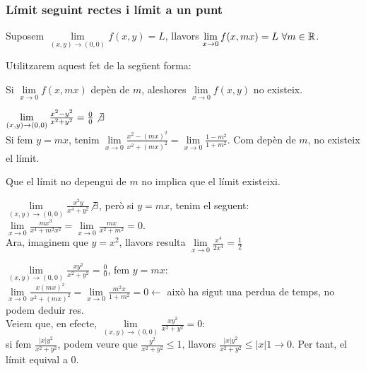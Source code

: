\documentclass[../main.tex]{subfiles}
\begin{document}
    \subsubsection{Límit seguint rectes i límit a un punt}
    \begin{proposicio}
        Suposem $\lim\limits_{(x,y) \rightarrow (0,0)} f(x,y) = L$, llavors $\lim\limits_{x \rightarrow 0} f(x, mx) = L \hbox{ }\forall m \in \mathbb{R}$.
    \end{proposicio}
    Utilitzarem aquest fet de la següent forma:
    \begin{corolari}
        Si $\lim\limits_{x\rightarrow0} f(x, mx)$ depèn de $m$, aleshores $\lim\limits_{x\rightarrow0}f(x,y)$ no existeix.
    \end{corolari}
    \begin{exemple}
        $\lim\limits_{(x,y) \rightarrow(0,0)} \frac{x^2-y^2}{x^2+y^2} = \frac{0}{0} \not\exists$\\
        Si fem $y = mx$, tenim $\lim\limits_{x \rightarrow 0} \frac{x^2-(mx)^2}{x^2+(mx)^2} = \lim\limits_{x \rightarrow 0} \frac{1-m^2}{1+m^2}$.
        Com depèn de $m$, no existeix el límit.
    \end{exemple}
    \begin{obs}
        Que el límit no depengui de $m$ no implica que el límit existeixi.
    \end{obs}
    \begin{exemple}
        $\lim\limits_{(x,y) \rightarrow(0,0)} \frac{x^2y}{x^4+y^2}$$\not\exists$, però si $y = mx$,
        tenim el seguent: $\lim\limits_{x\rightarrow0} \frac{mx^3}{x^4+m^2x^2} = \lim\limits_{x\rightarrow0} \frac{mx}{x^2+m^2} = 0$.\\
        Ara, imaginem que $y = x^2$, llavors resulta $\lim\limits_{x\rightarrow0} \frac{x^4}{2x^4} = \frac{1}{2}$
    \end{exemple}
    \begin{exemple}
        $\lim\limits_{(x,y) \rightarrow(0,0)} \frac{xy^2}{x^2+y^2} = \frac{0}{0}$, fem $y = mx$:\\
        $\lim\limits_{x \rightarrow0} \frac{x(mx)^2}{x^2+(mx)^2} = \lim\limits_{x \rightarrow0} \frac{m^2x}{1+m^2} = 0 \leftarrow$
        això ha sigut una perdua de temps, no podem deduir res.\\
        Veiem que, en efecte, $\lim\limits_{(x,y) \rightarrow(0,0)} \frac{xy^2}{x^2+y^2} = 0$:\\
        si fem $\frac{|x|y^2}{x^2+y^2}$, podem veure que $\frac{y^2}{x^2+y^2} \leq 1$, llavors $\frac{|x|y^2}{x^2+y^2} \leq |x|1 \longrightarrow 0$.
        Per tant, el límit equival a $0$.
    \end{exemple}
\end{document}
